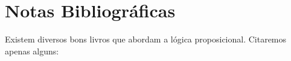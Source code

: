 
\section{Notas Bibliográficas}

Existem diversos bons livros que abordam a lógica
proposicional. Citaremos apenas alguns:
